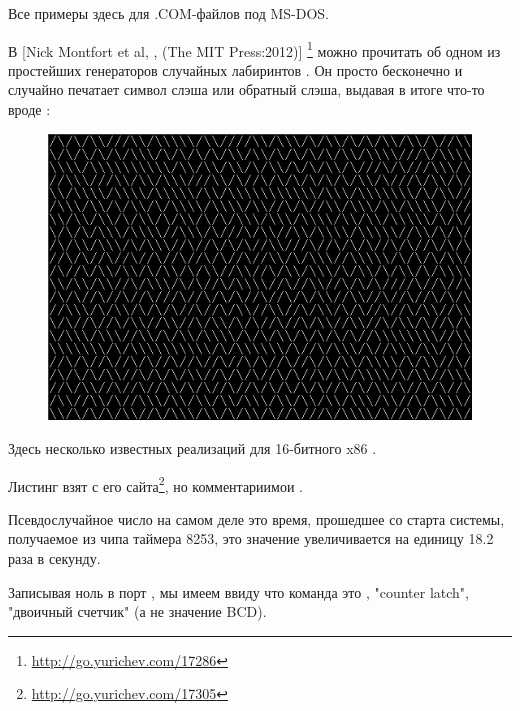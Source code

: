 
Все примеры здесь для .COM-файлов под MS-DOS.

В [Nick Montfort et al, , (The MIT Press:2012)]
\footnote{\AlsoAvailableAs \url{http://go.yurichev.com/17286}}
можно прочитать об одном из простейших генераторов случайных лабиринтов
.
Он просто бесконечно и случайно печатает символ слэша или обратный слэша, выдавая в итоге что-то вроде
:

\begin{figure}[H]
\centering
\includegraphics[scale=\NormalScale]{examples/demos/10print/10print.png}
\end{figure}

Здесь несколько известных реализаций для 16-битного x86
.


\newcommand{\FNURLTRIXTER}{\footnote{\url{http://go.yurichev.com/17305}}}

Листинг взят с его сайта\FNURLTRIXTER, но комментарии\EMDASH{}мои
.



Псевдослучайное число на самом деле это время, прошедшее со старта системы, получаемое из чипа таймера 8253, 
это значение
увеличивается на единицу 18.2 раза в секунду.

Записывая ноль в порт , 
мы имеем ввиду что команда это , 
"counter latch", 
"двоичный счетчик" (а не значение \ac{BCD}).

